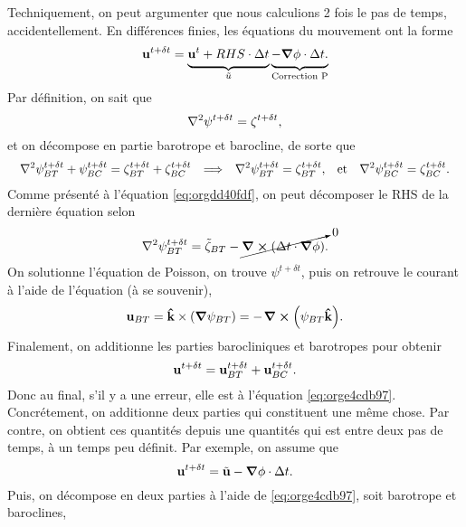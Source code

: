 \documentclass[10pt]{report}
\numberwithin{equation}{section}
\newcommand{\kvf}{\vb{\hat{k}}}
\newcommand{\uu}{\vb{u}}
\newcommand{\tall}{\vphantom{A^{x^x}_p}}
\newcommand{\pt}{\hspace{1pt}} %
\begin{document}
Techniquement, on peut argumenter que nous calculions 2 fois le pas de temps, accidentellement.
En différences finies, les équations du mouvement ont la forme
\begin{equation}
\label{eq:orgdd40fdf}
   \uu^{t+\delta t} =
   \underbrace{\uu^t + RHS\cdot \Delta t\tall}_{\tilde{u}}
   \underbrace{- \gradient{\phi}\cdot \Delta t.\tall}_\text{Correction P}
\end{equation}
Par définition, on sait que
\begin{equation}
   \laplacian{\psi^{t+\delta t}} = \zeta^{t+\delta t},
\end{equation}
et on décompose en partie barotrope et barocline, de sorte que
\begin{align}
   && \laplacian{\psi^{t+\delta t}_{BT} + \psi^{t+\delta t}_{BC}} = \zeta^{t+\delta t}_{BT} + \zeta^{t+\delta t}_{BC}
   && \Longrightarrow
   && \laplacian{\psi^{t+\delta t}}_{BT} = \zeta^{t+\delta t}_{BT},
   && \text{et}
   && \laplacian{\psi^{t+\delta t}}_{BC} = \zeta^{t+\delta t}_{BC}.&&
\end{align}
Comme présenté à l'équation \ref{eq:orgdd40fdf}, on peut décomposer le RHS de la dernière équation selon
\begin{align}
   \laplacian{\psi^{t+\delta t}}_{BT} = \tilde{\zeta}_{BT} - \cancelto{0}{\curl(\Delta t\cdot\gradient{\phi})}.
\end{align}
On solutionne l'équation de Poisson, on trouve \(\psi^{t+\delta t}\), puis on retrouve le courant à l'aide de l'équation (à se souvenir), 
\begin{equation}
   \uu_{BT} = \kvf \times \qty(\gradient{\psi_{BT}}) = - \pt\curl(\psi_{BT}\kvf).
\end{equation}
Finalement, on additionne les parties barocliniques et barotropes pour obtenir
\begin{equation}
\label{eq:orge4cdb97}
   \uu^{t+\delta t} = \uu_{BT}^{t+\delta t} + \uu_{BC}^{t+\delta t}.
\end{equation}
Donc au final, s'il y a une erreur, elle est à l'équation \ref{eq:orge4cdb97}.
Concrétement, on additionne deux parties qui constituent une même chose.
Par contre, on obtient ces quantités depuis une quantités qui est entre deux pas de temps, à un temps peu définit.
Par exemple, on assume que
\begin{equation}
   \uu^{t+\delta t} = \tilde{\uu} - \gradient{\phi} \cdot \Delta t.
\end{equation}
Puis, on décompose en deux parties à l'aide de \ref{eq:orge4cdb97}, soit barotrope et baroclines,
\end{document}
